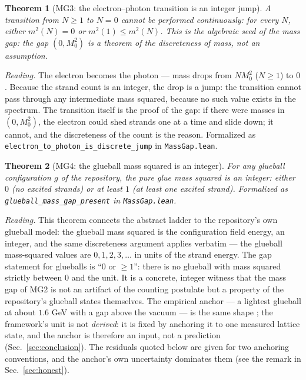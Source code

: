\documentclass[aps,prd,preprint,superscriptaddress,amsmath,amssymb]{revtex4-2}
\newtheorem{theorem}{Theorem}[section]
\begin{document}
\begin{theorem}[MG3: the electron--photon transition is an integer jump]
\label{thm:mg3}
A transition from $N\ge1$ to $N=0$ cannot be performed continuously:
for every $N$, either $m^2(N)=0$ or $m^2(1)\le m^2(N)$.  This is the
algebraic seed of the mass gap: the gap $(0,M_0^2)$ is a theorem of
the discreteness of mass, not an assumption.
\end{theorem}

\emph{Reading.}  The electron becomes the photon --- mass drops from
$N M_0^2$ ($N\ge1$) to $0$.  Because the strand count is an integer,
the drop is a jump: the transition cannot pass through any
intermediate mass squared, because no such value exists in the
spectrum.  The transition itself is the proof of the gap: if there
were masses in $(0,M_0^2)$, the electron could shed strands one at a
time and slide down; it cannot, and the discreteness of the count is
the reason.  Formalized as \texttt{electron\_to\_photon\_is\_discrete\_jump}
in \texttt{MassGap.lean}.

\begin{theorem}[MG4: the glueball mass squared is an integer]
\label{thm:mg4}
For any glueball configuration $g$ of the repository, the pure glue
mass squared is an integer: either $0$ (no excited strands) or at
least $1$ (at least one excited strand).
Formalized as \texttt{glueball\_mass\_gap\_present} in
\texttt{MassGap.lean}.
\end{theorem}

\emph{Reading.}  This theorem connects the abstract ladder to the
repository's own glueball model: the glueball mass squared is the
configuration field energy, an integer, and the same discreteness
argument applies verbatim --- the glueball mass-squared values are
$0,1,2,3,\ldots$ in units of the strand energy.  The gap statement
for glueballs is ``$0$ or $\ge1$'': there is no glueball with mass
squared strictly between $0$ and the unit.  It is a concrete,
integer witness that the mass gap of MG2 is not an artifact of the
counting postulate but a property of the repository's glueball
states themselves.  The empirical anchor --- a lightest glueball at
about $1.6$ GeV with a gap above the vacuum --- is the same shape
\cite{morningstar1999glueball,chen2006glueball};
the framework's unit is not \emph{derived}: it is fixed by anchoring it to
one measured lattice state, and the anchor is therefore an input, not a
prediction (Sec.~\ref{sec:conclusion}).  The residuals quoted below are
given for two anchoring conventions, and the anchor's own uncertainty
dominates them (see the remark in Sec.~\ref{sec:honest}).
\end{document}
